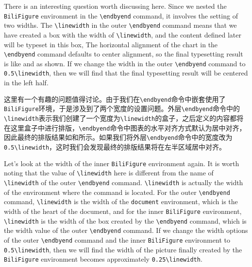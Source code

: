

\begin{ParaColumn}

    There is an interesting question worth discussing here.  Since we nested the \verb"BiliFigure" environment in the \verb"\endbyend" command, it involves the setting of two widths.  The \verb"\linewidth" in the outer \verb"\endbyend" command means that we have created a box with the width of \verb"\linewidth", and the content defined later will be typeset in this box, The horizontal alignment of the chart in the \verb"\endbyend"  command defaults to center alignment, so the final typesetting result is like  and  as shown.  If we change the width in the outer \verb"\endbyend" command to \verb"0.5\linewidth", then we will find that the final typesetting result will be centered in the left half.

    \switchcolumn

    这里有一个有趣的问题值得讨论。由于我们在\verb"\endbyend"命令中嵌套使用了\verb"BiliFigure"环境，于是涉及到了两个宽度的设置问题。外层\verb"\endbyend"命令中的\verb"\linewidth"表示我们创建了一个宽度为\verb"\linewidth"的盒子，之后定义的内容都将在这里盒子中进行排版，\verb"\endbyend"命令中图表的水平对齐方式默认为居中对齐，因此最终的排版结果如和所示。如果我们将外层\verb"\endbyend"命令中的宽度改为\verb"0.5\linewidth"，这时我们会发现最终的排版结果将在左半区域居中对齐。

    \switchcolumn*
        
    Let's look at the width of the inner \verb"BiliFigure" environment again.  It is worth noting that the value of \verb"\linewidth" here is different from the name of \verb"\linewidth" of the outer \verb"\endbyend" command.  \verb"\linewidth" is actually the width of the environment where the command is located. For the outer \verb"\endbyend" command, \verb"\linewidth" is the width of the \verb"document" environment, which is the width of the heart of the document, and for the inner \verb"BiliFigure" environment, \verb"\linewidth" is the width of the box created by the \verb"\endbyend" command, which is the width value of the outer \verb"\endbyend" command.  If we change the width options of the outer \verb"\endbyend" command and the inner \verb"BiliFigure" environment to \verb"0.5\linewidth", then we will find the width of the picture finally created by the \verb"BiliFigure" environment becomes approximately \verb"0.25\linewidth".


\end{ParaColumn}
